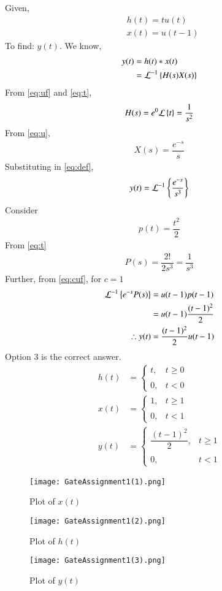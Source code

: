 \documentclass[journal,12pt,twocolumn]{IEEEtran}
\begin{document}
Given,
\begin{align}
    &h(t)=tu(t)\\
    &x(t)=u(t-1)
\end{align}
To find: $y(t)$. We know, 
\begin{align}
y(t)&=h(t)*x(t)\\
&=\mathcal{L}^{-1}\left\{H(s)X(s)\right\}
\label{eq:def}
\end{align}
From \eqref{eq:uf} and \eqref{eq:t}, 
\begin{align}
H(s)=e^{0}\mathcal{L}\left\{t\right\}=\dfrac{1}{s^2}
\end{align}
From \eqref{eq:u}, 
\begin{align}
X(s)=\dfrac{e^{-s}}{s}
\end{align}
Substituting in \eqref{eq:def},
\begin{align}
y(t)=\mathcal{L}^{-1}\left\{\dfrac{e^{-s}}{s^3}\right\}
\end{align}
Consider 
\begin{align}
    p(t)=\dfrac{t^{2}}{2}
\end{align}
From \eqref{eq:t}
\begin{align}
    P(s)=\dfrac{2!}{2s^3}=\dfrac{1}{s^3}
\end{align}
Further, from \eqref{eq:cuf}, for $c=1$
\begin{align}
    \mathcal{L}^{-1}\left\{e^{-s}P(s)\right\}&=u(t-1)p(t-1)\\
    &=u(t-1)\dfrac{(t-1)^2}{2}\\
    \therefore y(t)&=\dfrac{(t-1)^2}{2}u(t-1)
\end{align}
Option 3 is the correct answer.
\begin{align}
    h(t)&=\begin{cases}
	t, & t \geq 0 \\~\\[-1em]
	0, & t <0
	\end{cases}\\
	x(t)&=\begin{cases}
	1, & t \geq 1 \\~\\[-1em]
	0, & t <1
	\end{cases}\\
	y(t)&=\begin{cases}
	\dfrac{(t-1)^2}{2}, & t \geq 1 \\~\\[-1em]
	0, & t <1
	\end{cases}
\end{align}
\begin{figure}[!h]
 \centering
 \texttt{[image: GateAssignment1(1).png]}
 \caption{Plot of $x(t)$}
 \label{plot}
\end{figure}

\begin{figure}[!h]
 \centering
 \texttt{[image: GateAssignment1(2).png]}
 \caption{Plot of $h(t)$}
 \label{plot}
\end{figure}

\begin{figure}[!h]
 \centering
 \texttt{[image: GateAssignment1(3).png]}
 \caption{Plot of $y(t)$}
 \label{plot}
\end{figure}
\end{document}
